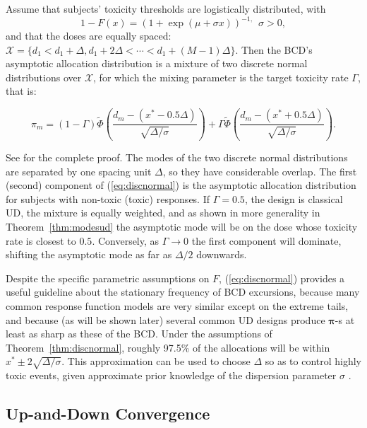 \begin{thm}\label{thm:discnormal}
Assume that subjects' toxicity thresholds are logistically distributed, with $$1-F(x)=(1+\exp(\mu+\sigma x))^{-1,}\ \ \sigma>0,$$ and that the doses are equally spaced: $\mathcal{X}=\{d_1<d_1+\Delta,d_1+2\Delta<\cdots<d_1+(M-1)\Delta\}.$ Then the BCD's asymptotic allocation distribution is a mixture of two discrete normal distributions over $\mathcal{X}$,  for which the mixing parameter is the target toxicity rate $\Gamma$, that is:

\begin{equation}\label{eq:discnormal}
\pi_m=(1-\Gamma)\tilde{\Phi}\left(\frac{d_m-(x^*-0.5\Delta)}{\sqrt{\Delta/\sigma}}\right)+\Gamma\tilde{\Phi}\left(\frac{d_m-(x^*+0.5\Delta)}{\sqrt{\Delta/\sigma}}\right).
\end{equation}
\end{thm}

See \cite{Durh:Flou:rand:1994} for the complete proof. The modes of the two discrete normal distributions are separated by one spacing unit $\Delta$, so they have considerable overlap. The first (second) component of (\ref{eq:discnormal}) is the asymptotic allocation distribution for subjects with non-toxic (toxic) responses. If $\Gamma=0.5$, the design is classical UD, the mixture is equally weighted, and as shown in more generality in Theorem~\ref{thm:modesud} the asymptotic mode will be on the dose whose toxicity rate is closest to $0.5$. Conversely, as $\Gamma\to 0$ the first component will dominate, shifting the asymptotic mode as far as $\Delta/2$ downwards.

Despite the specific parametric assumptions on $F$,  (\ref{eq:discnormal}) provides a useful guideline about the stationary frequency of BCD excursions, because many common response function models are very similar except on the extreme tails, and because (as will be shown later) several common UD designs produce $\boldsymbol{\pi}$-s at least as sharp as these of the BCD. Under the assumptions of Theorem~\ref{thm:discnormal}, roughly 97.5\% of the allocations will be within $x^*\pm 2\sqrt{\Delta/\sigma}$.  This approximation can be used to choose $\Delta$ so as to control highly toxic events, given approximate prior knowledge of the dispersion parameter $\sigma$ \citep{Durh:Flou:Rose:rand:1997}.

\subsection{Up-and-Down Convergence}

